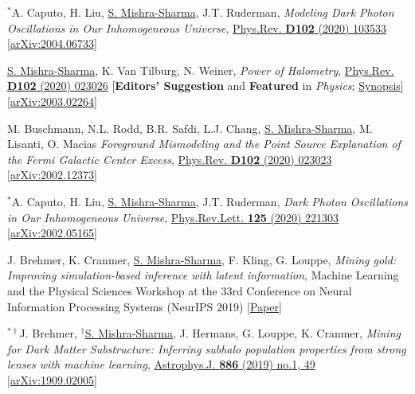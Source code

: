 \documentclass[letterpaper,11pt]{article}
\newenvironment{packed_enumerate}[1][]{
\begin{etaremune}[#1]
  \setlength{\itemsep}{3.7pt}
  \setlength{\parskip}{0pt}
  \setlength{\parsep}{0pt}}{\end{etaremune}
}
\begin{document}
\begin{packed_enumerate}[start=37]
  \item $^*$A. Caputo, H. Liu, \underline{S. Mishra-Sharma}, J.T. Ruderman, \emph{Modeling Dark Photon Oscillations in Our Inhomogeneous Universe}, \href{https://journals.aps.org/prd/abstract/10.1103/PhysRevD.102.103533}{Phys.Rev. \textbf{D102} (2020) 103533}   \href{https://arxiv.org/abs/2004.06733}{[arXiv:2004.06733]}

  \item \underline{S. Mishra-Sharma}, K. Van Tilburg, N. Weiner, \emph{Power of Halometry}, \href{https://journals.aps.org/prd/abstract/10.1103/PhysRevD.102.023026}{Phys.Rev. \textbf{D102} (2020) 023026} [\textbf{Editors' Suggestion} and \textbf{Featured} in \emph{Physics}; \href{https://physics.aps.org/articles/v13/s98}{Synopsis}]  \href{https://arxiv.org/abs/2003.02264}{[arXiv:2003.02264]}

  \item M. Buschmann, N.L. Rodd, B.R. Safdi, L.J. Chang, \underline{S. Mishra-Sharma}, M. Lisanti, O. Macias \emph{Foreground Mismodeling and the Point Source Explanation of the Fermi Galactic Center Excess},  \href{https://journals.aps.org/prd/abstract/10.1103/PhysRevD.102.023023}{Phys.Rev. \textbf{D102} (2020) 023023} \href{https://arxiv.org/abs/2002.12373}{[arXiv:2002.12373]} 

  \item $^*$A. Caputo, H. Liu, \underline{S. Mishra-Sharma}, J.T. Ruderman, \emph{Dark Photon Oscillations in Our Inhomogeneous Universe}, \href{https://journals.aps.org/prl/abstract/10.1103/PhysRevLett.125.221303}{Phys.Rev.Lett. \textbf{125} (2020) 221303}  \href{https://arxiv.org/abs/2002.05165}{[arXiv:2002.05165]}

  \item J. Brehmer, K. Cranmer, \underline{S. Mishra-Sharma}, F. Kling, G. Louppe, \emph{Mining gold: Improving simulation-based inference with latent information}, {Machine Learning and the Physical Sciences Workshop at the 33rd Conference on Neural Information Processing Systems (NeurIPS 2019)} \href{https://ml4physicalsciences.github.io/files/NeurIPS_ML4PS_2019_16.pdf}{[Paper]}

  \item $^{*\dagger}$J. Brehmer, $^\dagger$\underline{S. Mishra-Sharma}, J. Hermans, G. Louppe, K. Cranmer, \emph{Mining for Dark Matter Substructure: Inferring subhalo population properties from strong lenses with machine learning}, \href{https://iopscience.iop.org/article/10.3847/1538-4357/ab4c41}{Astrophys.J. \textbf{886} (2019) no.1, 49} \href{https://arxiv.org/abs/1909.02005}{[arXiv:1909.02005]}


\end{packed_enumerate}
\end{document}
